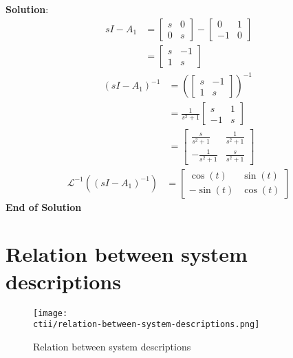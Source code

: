 \begin{multicols}{2}
\textbf{Solution}:
\begin{align*}
    sI - A_1 &= \begin{bmatrix} s & 0 \\ 0 & s \end{bmatrix} 
    - \begin{bmatrix} 0 & 1 \\ -1 & 0 \end{bmatrix} \\
    &= \begin{bmatrix} s & -1 \\ 1 & s \end{bmatrix}
\end{align*}
\begin{align*}
    (sI - A_1)^{-1} &= \left(\begin{bmatrix} s & -1 \\ 1 & s \end{bmatrix}\right)^{-1} \\
    &= \frac{1}{s^2 + 1}\begin{bmatrix} s & 1 \\ -1 & s \end{bmatrix} \\
    &= \begin{bmatrix} \frac{s}{s^2 + 1} & \frac{1}{s^2 + 1} \\ -\frac{1}{s^2 + 1} & \frac{s}{s^2 + 1} \end{bmatrix}
\end{align*}
\begin{align*}
    \mathcal{L}^{-1}((sI - A_1)^{-1}) &=  \begin{bmatrix} \cos(t) & \sin(t) \\ -\sin(t) & \cos(t) \end{bmatrix}
\end{align*}
\textbf{End of Solution}



\section{Relation between system descriptions}
\begin{figure}[H]
    \centering
    \texttt{[image: \\ctii/relation-between-system-descriptions.png]}
    \caption{Relation between system descriptions}
\end{figure}



\end{multicols}
